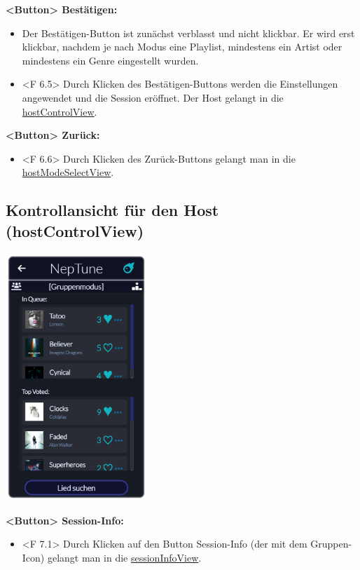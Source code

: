 \documentclass[oneside, ngerman]{sdqtechreport}
\begin{document}
\textbf{<Button> Bestätigen:}
\begin{itemize}
    \item Der Bestätigen-Button ist zunächst verblasst und nicht klickbar. Er wird erst klickbar, nachdem je nach Modus eine Playlist, mindestens ein Artist oder mindestens ein Genre eingestellt wurden.
    \item <F 6.5> Durch Klicken des Bestätigen-Buttons werden die Einstellungen angewendet und die Session eröffnet. Der Host gelangt in die \hyperlink{hostControlView}{hostControlView}.
\end{itemize}

\textbf{<Button> Zurück:}
\begin{itemize}
    \item <F 6.6> Durch Klicken des Zurück-Buttons gelangt man in die  \hyperlink{hostModeSelectView}{hostModeSelectView}.
\end{itemize}



\subsection{Kontrollansicht für den Host (hostControlView)}
\label{sec:Benutzeroberfläche:hostControlView}

\begin{center}
    \hypertarget{hostControlView}{}
    \includegraphics[width=0.4\textwidth]{LATEX/Pflichtenheft/GraphicDesigns/hostControlPage.png}
\end{center}

\textbf{<Button> Session-Info:}
\begin{itemize}
    \item <F 7.1> Durch Klicken auf den Button Session-Info (der mit dem Gruppen-Icon) gelangt man in die \hyperlink{sessionInfoView}{sessionInfoView}.
\end{itemize}
\end{document}
